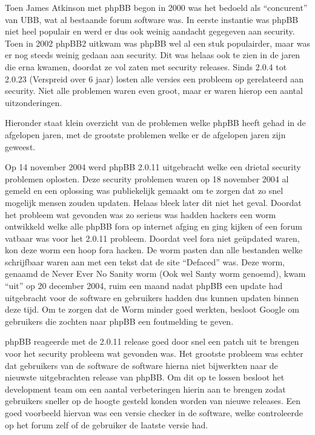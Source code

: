 Toen James Atkinson met phpBB begon in 2000 was het bedoeld als ``concurent'' van UBB, wat al bestaande forum software was. In eerste instantie was phpBB niet heel populair en werd er dus ook weinig aandacht gegegeven aan security. Toen in 2002 phpBB2 uitkwam was phpBB wel al een stuk populairder, maar was er nog steeds weinig gedaan aan security. Dit was helaas ook te zien in de jaren die erna kwamen, doordat ze vol zaten met security releases. Sinds 2.0.4 tot 2.0.23 (Verspreid over 6 jaar) losten alle versies een probleem op gerelateerd aan security. Niet alle problemen waren even groot, maar er waren hierop een aantal uitzonderingen.

Hieronder staat klein overzicht van de problemen welke phpBB heeft gehad in de afgelopen jaren, met de grootste problemen welke er de afgelopen jaren zijn geweest.

Op 14 november 2004 werd phpBB 2.0.11 uitgebracht\cite{bib.phpbb.history.2011} welke een drietal security problemen oplosten. Deze security problemen waren op 18 november 2004 al gemeld en een oplossing was publiekelijk gemaakt\cite{bib.phpbb.history.2011a} om te zorgen dat zo snel mogelijk mensen zouden updaten. Helaas bleek later dit niet het geval\cite{bib.phpbb.history.2011b}. Doordat het probleem wat gevonden was zo serieus was hadden hackers een worm ontwikkeld welke alle phpBB fora op internet afging en ging kijken of een forum vatbaar was voor het 2.0.11 probleem. Doordat veel fora niet ge\"{u}pdated waren, kon deze worm een hoop fora hacken. De worm pasten dan alle bestanden welke schrijfbaar waren aan met een tekst dat de site ``Defaced'' was. Deze worm, genaamd de Never Ever No Sanity worm (Ook wel Santy worm genoemd), kwam ``uit'' op 20 december 2004\cite{bib.phpbb.history.2011c}, ruim een maand nadat phpBB een update had uitgebracht voor de software en gebruikers hadden dus kunnen updaten binnen deze tijd. Om te zorgen dat de Worm minder goed werkten, besloot Google om gebruikers die zochten naar phpBB een foutmelding te geven\cite{bib.phpbb.history.google}.

phpBB reageerde met de 2.0.11 release goed door snel een patch uit te brengen voor het security probleem wat gevonden was. Het grootste probleem was echter dat gebruikers van de software de software hierna niet bijwerkten naar de nieuwste uitgebrachten release van phpBB. Om dit op te lossen besloot het development team om een aantal verbeteringen hierin aan te brengen zodat gebruikers sneller op de hoogte gesteld konden worden van nieuwe releases. Een goed voorbeeld hiervan was een versie checker in de software, welke controleerde op het forum zelf of de gebruiker de laatste versie had\cite{bib.phpbb.history.2012}.

